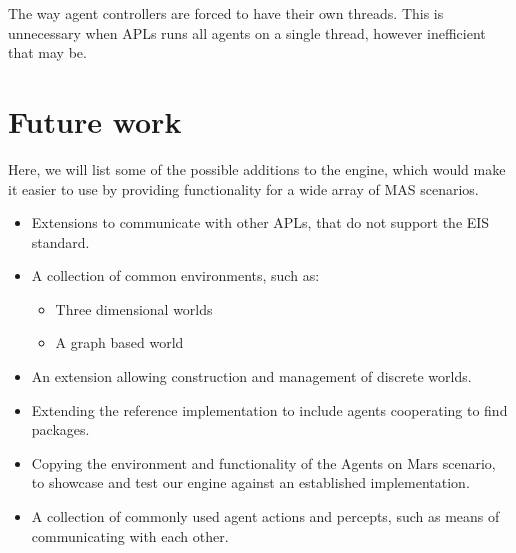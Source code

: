 \textbullet{} The way agent controllers are forced to have their own
threads. This is unnecessary when APLs runs all agents on a single
thread, however inefficient that may be.


\section{Future work}

Here, we will list some of the possible additions to the engine, which
would make it easier to use by providing functionality for a wide
array of MAS scenarios.
\begin{itemize}
\item Extensions to communicate with other APLs, that do not support the
EIS standard.
\item A collection of common environments, such as:

\begin{itemize}
\item Three dimensional worlds
\item A graph based world
\end{itemize}
\item An extension allowing construction and management of discrete worlds.
\item Extending the reference implementation to include agents cooperating
to find packages. 
\item Copying the environment and functionality of the Agents on Mars scenario,
to showcase and test our engine against an established implementation.
\item A collection of commonly used agent actions and percepts, such as
means of communicating with each other.\end{itemize}


